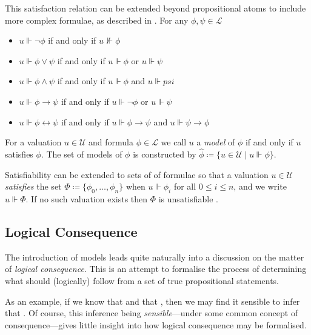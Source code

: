 This satisfaction relation can be extended beyond propositional atoms to include more complex formulae, as described in . For any $\phi, \psi \in \mathcal{L}$ 

\begin{itemize}
  \item $u \Vdash \neg \phi$ if and only if $u \nVdash \phi$
  \item $u \Vdash \phi \vee \psi$ if and only if $u \Vdash \phi$ or $u \Vdash \psi$
  \item $u \Vdash \phi \wedge \psi$ if and only if $u \Vdash \phi$ and $u \Vdash psi$
  \item $u \Vdash \phi \rightarrow \psi$ if and only if $u \Vdash \neg \phi$ or $u \Vdash \psi$
  \item $u \Vdash \phi \leftrightarrow \psi$ if and only if $u \Vdash \phi \rightarrow \psi$ and $u \Vdash \psi \rightarrow \phi$
\end{itemize}

\begin{definition} 
  \label{definition:model}
  For a valuation $u \in \mathcal{U}$ and formula $\phi \in \mathcal{L}$ we call $u$ a \textit{model} of $\phi$ if and only if $u$ satisfies $\phi$. The set of models of $\phi$ is constructed by $\hat{\phi} \coloneqq \{u \in \mathcal{U} \mid u \Vdash \phi \}$.
\end{definition}

Satisfiability can be extended to sets of of formulae so that a valuation $u \in \mathcal{U}$ \textit{satisfies} the set $\Phi \coloneqq \{\phi_0, \ldots, \phi_n \}$ when $u \Vdash \phi_i$ for all $0 \leq i \leq n$, and we write $u \Vdash \Phi$. If no such valuation exists then $\Phi$ is unsatisfiable \cite[p. 31]{Ben1993Mathematical}. 

\subsection{Logical Consequence}
\label{subsection:logical-consequence}

The introduction of models leads quite naturally into a discussion on the matter of \textit{logical consequence}. This is an attempt to formalise the process of determining what should (logically) follow from a set of true propositional statements.

As an example, if we know that  and that , then we may find it sensible to infer that . Of course, this inference being \textit{sensible}---under some common concept of consequence---gives little insight into how logical consequence may be formalised.

